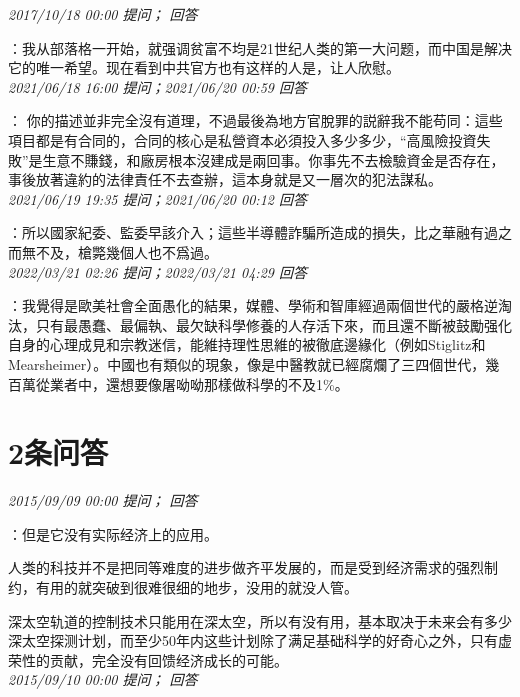 \documentclass[twocolumn]{ctexart}
\begin{document}
\textit{\hfill\noindent\small 2017/10/18 00:00 提问； 回答}

：我从部落格一开始，就强调贫富不均是21世纪人类的第一大问题，而中国是解决它的唯一希望。现在看到中共官方也有这样的人是，让人欣慰。\\

\textit{\hfill\noindent\small 2021/06/18 16:00 提问；2021/06/20 00:59 回答}

：
你的描述並非完全沒有道理，不過最後為地方官脫罪的説辭我不能苟同：這些項目都是有合同的，合同的核心是私營資本必須投入多少多少，“高風險投資失敗”是生意不賺錢，和廠房根本沒建成是兩回事。你事先不去檢驗資金是否存在，事後放著違約的法律責任不去查辦，這本身就是又一層次的犯法謀私。
\\

\textit{\hfill\noindent\small 2021/06/19 19:35 提问；2021/06/20 00:12 回答}

：所以國家紀委、監委早該介入；這些半導體詐騙所造成的損失，比之華融有過之而無不及，槍斃幾個人也不爲過。
\\

\textit{\hfill\noindent\small 2022/03/21 02:26 提问；2022/03/21 04:29 回答}

：我覺得是歐美社會全面愚化的結果，媒體、學術和智庫經過兩個世代的嚴格逆淘汰，只有最愚蠢、最偏執、最欠缺科學修養的人存活下來，而且還不斷被鼓勵强化自身的心理成見和宗教迷信，能維持理性思維的被徹底邊緣化（例如Stiglitz和Mearsheimer）。中國也有類似的現象，像是中醫教就已經腐爛了三四個世代，幾百萬從業者中，還想要像屠呦呦那樣做科學的不及1\%。
\\

\section{2条问答}

\textit{\hfill\noindent\small 2015/09/09 00:00 提问； 回答}

：但是它没有实际经济上的应用。

人类的科技并不是把同等难度的进步做齐平发展的，而是受到经济需求的强烈制约，有用的就突破到很难很细的地步，没用的就没人管。

深太空轨道的控制技术只能用在深太空，所以有没有用，基本取决于未来会有多少深太空探测计划，而至少50年内这些计划除了满足基础科学的好奇心之外，只有虚荣性的贡献，完全没有回馈经济成长的可能。\\

\textit{\hfill\noindent\small 2015/09/10 00:00 提问； 回答}
\end{document}
